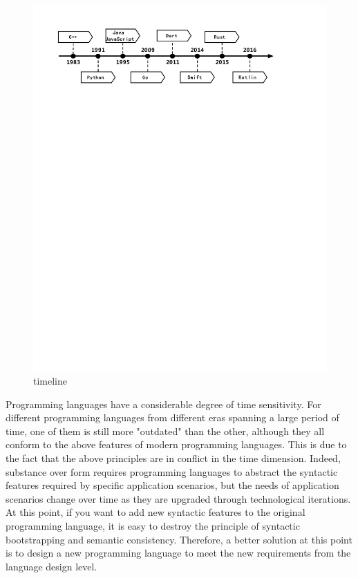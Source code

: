 \begin{figure}[htbp]
    \centerline{\includegraphics[scale=0.6]{figures/timeline}}
    \caption{timeline}
    \label{fig:timeline}
\end{figure}

Programming languages have a considerable degree of time sensitivity. For different programming languages from different eras spanning a large period of time, one of them is still more "outdated" than the other, although they all conform to the above features of modern programming languages. This is due to the fact that the above principles are in conflict in the time dimension. Indeed, substance over form requires programming languages to abstract the syntactic features required by specific application scenarios, but the needs of application scenarios change over time as they are upgraded through technological iterations. At this point, if you want to add new syntactic features to the original programming language, it is easy to destroy the principle of syntactic bootstrapping and semantic consistency. Therefore, a better solution at this point is to design a new programming language to meet the new requirements from the language design level.

